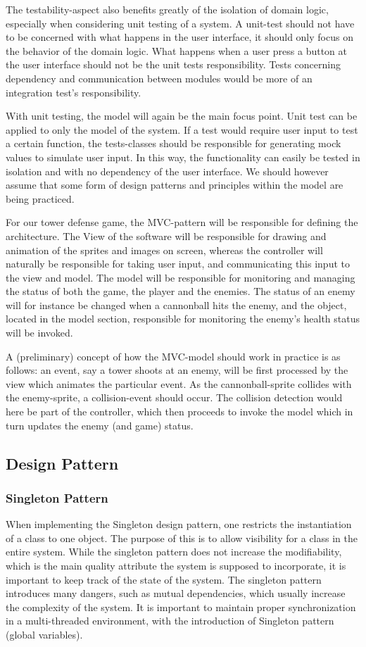 The testability-aspect also benefits greatly of the isolation of domain logic, especially when considering unit testing of a system. A unit-test should not have to be concerned with what happens in the user interface, it should only focus on the behavior of the domain logic. What happens when a user press a button at the user interface should not be the unit tests responsibility. Tests concerning dependency and communication between modules would be more of an integration test's responsibility. 


With unit testing, the model will again be the main focus point. Unit test can be applied to only the model of the system. If a test would require user input to test a certain function, the tests-classes should be responsible for generating mock values to simulate user input. In this way, the functionality can easily be tested in isolation and with no dependency of the user interface. We should however assume that some form of design patterns and principles within the model are being practiced.


For our tower defense game, the MVC-pattern will be responsible for defining the architecture. The View of the software will be responsible for drawing and animation of the sprites and images on screen, whereas the controller will naturally be responsible for taking user input, and communicating this input to the view and model. The model will be responsible for monitoring and managing the status of both the game, the player and the enemies. The status of an enemy will for instance be changed when a cannonball hits the enemy, and the object, located in the model section,  responsible for monitoring the enemy's health status will be invoked. 

A (preliminary) concept of how the MVC-model should work in practice is as follows: an event, say a tower shoots at an enemy, will be first processed by the view which animates the particular event. As the cannonball-sprite collides with the enemy-sprite, a collision-event should occur. The collision detection would here be part of the controller, which then proceeds to invoke the model which in turn updates the enemy (and game) status. 
\subsection{Design Pattern}
\subsubsection{Singleton Pattern}
When implementing the Singleton design pattern, one restricts the instantiation of a class to one object. The purpose of this is to allow visibility for a class in the entire system. While the singleton pattern does not increase the modifiability, which is the main quality attribute the system is supposed to incorporate, it is important to keep track of the state of the system. The singleton pattern introduces many dangers, such as mutual dependencies, which usually increase the complexity of the system. It is important to maintain proper synchronization in a multi-threaded environment, with the introduction of Singleton pattern (global variables).

